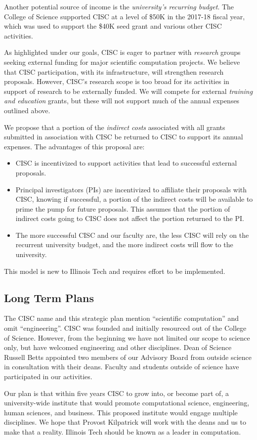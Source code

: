 \documentclass[12pt]{amsart}
\begin{document}
Another potential source of income is the \emph{university's recurring budget}.  The College of Science supported CISC at a level of \$50K in the 2017-18 fiscal year, which was used to support the \$40K seed grant and various other CISC activities.

As highlighted under our goals, CISC is eager to partner with \emph{research} groups seeking external funding for major scientific computation projects.  We believe that CISC participation, with its infrastructure, will strengthen research proposals.  However, CISC's research scope is too broad for its activities in support of research to be externally funded.  We will compete for external \emph{training and education} grants, but these will not support much of the annual expenses outlined above.

We propose that a portion of the \emph{indirect costs} associated with all grants submitted in association with CISC be returned to CISC to support its annual expenses.  The advantages of this proposal are:
\begin{itemize}
    \item CISC is incentivized to support activities that lead to successful external proposals.
    
    \item Principal investigators (PIs) are incentivized to affiliate their proposals with CISC, knowing if successful, a portion of the indirect costs will be available to prime the pump for future proposals.  This assumes that the portion of indirect costs going to CISC does not affect the portion returned to the PI.
    
    \item The more successful CISC and our faculty are, the less CISC will rely on the recurrent university budget, and the more indirect costs will flow to the university.
\end{itemize}
This model is new to Illinois Tech and requires effort to be implemented.


\subsection*{Long Term Plans}
The CISC name and this strategic plan mention ``scientific computation'' and omit ``engineering''.  CISC was founded and initially resourced out of the College of Science.  However, from the beginning we have not limited our scope to science only, but have welcomed engineering and other disciplines.  Dean of Science Russell Betts appointed two members of our Advisory Board from outside science in consultation with their deans.  Faculty and students outside of science have participated in our activities.

Our plan is that within five years CISC to grow into, or become part of, a university-wide institute that would promote computational science, engineering, human sciences, and business.  This proposed institute would engage multiple disciplines.  We hope that Provost Kilpatrick will work with the deans and us to make that a reality.  Illinois Tech should be known as a leader in computation.
\end{document}

